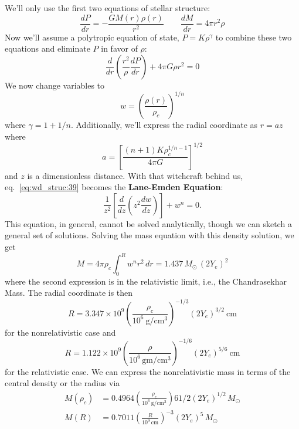 \documentclass[10pt]{article}
\numberwithin{equation}{section}
\newcommand{\n}{\noindent}
\begin{document}
		\n We'll only use the first two equations of stellar structure:
		\begin{equation}
			\label{eq:wd_struc:38} \frac{dP}{dr}= -\frac{G M(r)\rho(r)}{r^2} \qquad \frac{dM}{dr} = 4\pi r^2\rho
		\end{equation}
		Now we'll assume a polytropic equation of state, $P=K\rho^\gamma$ to combine these two equations and eliminate $P$ in favor of $\rho$:
		\begin{equation}
			\label{eq:wd_struc:39} \frac{d}{dr}\left(\frac{r^2}{\rho}\frac{dP}{dr}\right) + 4\pi G \rho r^2 = 0
		\end{equation}
		We now change variables to
		\begin{equation}
			\label{eq:wd_struc:40} w = \left(\frac{\rho(r)}{\rho_c}\right)^{1/n}
		\end{equation}
		where $\gamma = 1 + 1/n$. Additionally, we'll express the radial coordinate as $r = az$ where
		\begin{equation}
			\label{eq:wd_struc:41} a = \left[\frac{(n+1)K\rho_c^{1/n - 1}}{4\pi G}\right]^{1/2}
		\end{equation}
		and $z$ is a dimensionless distance. With that witchcraft behind us, eq.~\eqref{eq:wd_struc:39} becomes the \textbf{Lane-Emden Equation}:
		\begin{equation}
			\label{eq:wd_struc:42} \frac{1}{z^2}\left[\frac{d}{dz}\left(z^2\frac{dw}{dz}\right)\right] + w^n = 0.
		\end{equation}
		This equation, in general, cannot be solved analytically, though we can sketch a general set of solutions. Solving the mass equation with this density solution, we get
		\begin{equation}
			\label{eq:wd_struc:43} M = 4\pi \rho_c\int_0^R w^n r^2\,dr = 1.437\,M_\odot\,(2Y_e)^2
		\end{equation}
		where the second expression is in the relativistic limit, i.e., the Chandrasekhar Mass. The radial coordinate is then
		\begin{equation}
			\label{eq:wd_struc:44} R = 3.347\times 10^9\left(\frac{\rho_c}{10^6\ \mathrm{g/cm^3}}\right)^{-1/3}\left(2Y_e\right)^{3/2}\ \mathrm{cm}
		\end{equation}
		for the nonrelativistic case and
		\begin{equation}
			\label{eq:wd_struc:45} R = 1.122\times 10^9\left(\frac{\rho}{10^6\,\mathrm{gm/cm^3}}\right)^{-1/6}\left(2Y_e\right)^{5/6}\ \mathrm{cm}
		\end{equation}
		for the relativistic case. We can express the nonrelativistic mass in terms of the central density or the radius via
		\begin{align}
			M(\rho_c) &= 0.4964\left(\frac{\rho_c}{10^6\,\mathrm{g/cm^3}}\right)6{1/2}\left(2Y_e\right)^{1/2}\,M_\odot\\
			M(R) &= 0.7011 \left(\frac{R}{10^9\,\mathrm{cm}}\right)^{-3}\left(2Y_e\right)^5\,M_\odot
		\end{align}
\end{document}
